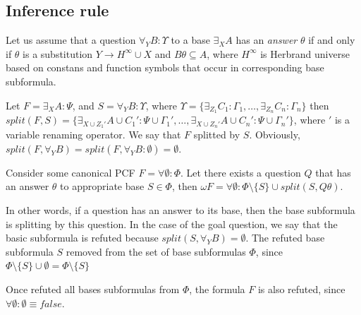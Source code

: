 \documentclass[runningheads,a4paper]{llncs}
\begin{document}
\subsection{Inference rule}

\begin{definition}[Answer]
\label{answer}
Let us assume that a question $\forall_YB:\Upsilon$ to a base $\exists_XA$ has an {\em answer} $\theta$ if and only if $\theta$ is a substitution $Y \rightarrow H^{\infty} \cup X$ and $B\theta \subseteq A$, where $H^{\infty}$ is Herbrand universe based on constans and function symbols that occur in corresponding base subformula.
\end{definition}

\begin{definition}[Splitting]
\label{splitting}
Let $F = \exists_XA\colon\Psi$, and $S = \forall_YB\colon\Upsilon$, where $\Upsilon = \{\exists_{Z_1}C_1\colon\Gamma_1,\ldots,\exists_{Z_n}C_n\colon\Gamma_n\}$ then $split(F,S) = \{\exists_{X \cup {Z_1}'} A \cup {C_1}'\colon\Psi \cup {\Gamma_1}',\ldots,\exists_{X \cup {Z_n}'} A \cup {C_n}'\colon\Psi \cup {\Gamma_n}'\}$, where $'$ is a variable renaming operator. We say that $F$ splitted by $S$. Obviously, $split(F,\forall_YB) = split(F,\forall_YB\colon\emptyset) = \emptyset$.
\end{definition}

\begin{definition}
Consider some canonical PCF $F = \forall\emptyset\colon\Phi$. Let there exists a question $Q$ that has an answer $\theta$ to appropriate base $S \in \Phi$, then $\omega F  = \forall \emptyset\colon\Phi \setminus \{S\} \cup split(S,Q\theta)$.
\end{definition}

In other words, if a question has an answer to its base, then the base subformula is splitting by this question. In the case of the goal question, we say that the basic subformula is refuted because $split(S,\forall_YB) = \emptyset$. The refuted base subformula $S$ removed from the set of base subformulas $\Phi$, since $\Phi \setminus \{S\} \cup \emptyset = \Phi \setminus \{S\}$

Once refuted all bases subformulas from $\Phi$, the formula $F$ is also refuted, since $\forall \emptyset\colon\emptyset \equiv false$. %


\end{document}
